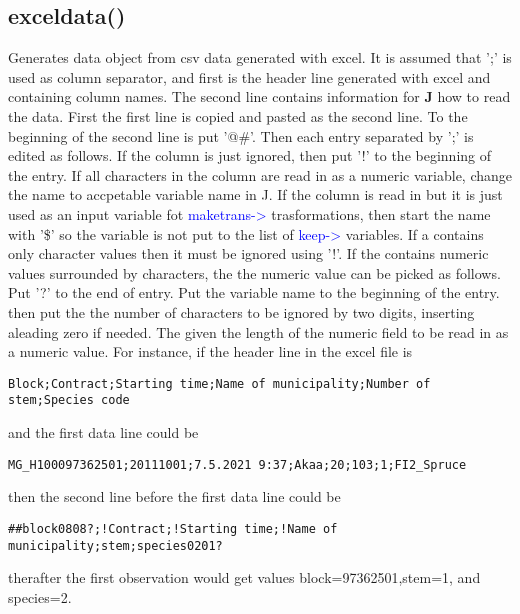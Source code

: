 \subsection{\textcolor{VioletRed}{exceldata}()}
\label{exceldata}
Generates data object from csv data generated with excel. It is assumed that ';' is used as column separator,
and first is the header line generated with excel and containing column names.
The second line contains information for \textbf{J} how to read the data.
First the first line is copied and pasted as the second line. To the beginning of the second line is put
'@\#'. Then each entry separated by ';' is edited as follows. If the column is just ignored, then
put '!' to the beginning of the entry. If all characters in the column are read in as
a numeric variable, change the name to accpetable variable name in J.
If the column is read in but it is just used as an input variable fot
\textcolor{blue}{maketrans->} trasformations, then start the name with '\$' so the variable is not put to
the list of \textcolor{blue}{keep->} variables. If a contains only character values then it must
be ignored using '!'. If the contains numeric values surrounded by characters, the the numeric value can be picked
as follows. Put '?' to the end of entry. Put the variable name to the beginning of the entry.
then put the the number of characters to be ignored by two digits, inserting
aleading zero if needed. The given the length of the numeric field to be read in as a numeric value.
For instance, if the header line in the excel file is
\color{Green}
\begin{verbatim}
Block;Contract;Starting time;Name of municipality;Number of stem;Species code
\end{verbatim}
\color{Black}
and the first data line could be
\color{Green}
\begin{verbatim}
MG_H100097362501;20111001;7.5.2021 9:37;Akaa;20;103;1;FI2_Spruce
\end{verbatim}
\color{Black}
then the second line before the first data line could be
\color{Green}
\begin{verbatim}
##block0808?;!Contract;!Starting time;!Name of municipality;stem;species0201?
\end{verbatim}
\color{Black}
therafter the first observation would get values block=97362501,stem=1, and
species=2.


